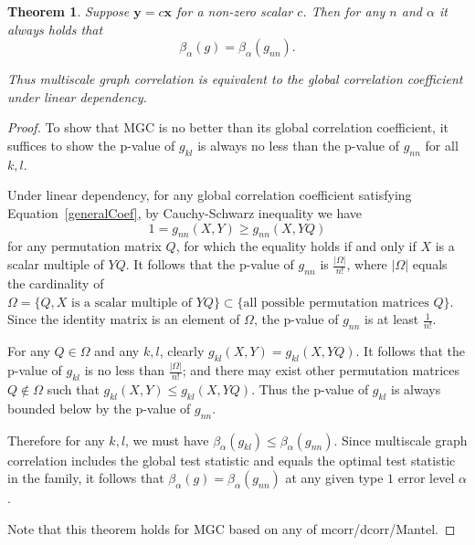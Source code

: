 \documentclass[11pt]{article}
\providecommand{\mb}[1]{\boldsymbol{#1}}
\newtheorem{thm}{Theorem}
\begin{document}
\begin{thm}
Suppose $\mb{y}=c\mb{x}$ for a non-zero scalar $c$. Then for any $n$ and $\alpha$ it always holds that
\begin{equation}
\beta_{\alpha}(g) = \beta_{\alpha}(g_{nn}).
\end{equation}

Thus multiscale graph correlation is equivalent to the global correlation coefficient under linear dependency.
\end{thm}
\begin{proof}
To show that MGC is no better than its global correlation coefficient, it suffices to show the p-value of $g_{kl}$ is always no less than the p-value of $g_{nn}$ for all $k,l$.


Under linear dependency, for any global correlation coefficient satisfying Equation~\ref{generalCoef}, by Cauchy-Schwarz inequality we have
\begin{equation}
1=g_{nn}(X, Y) \geq g_{nn}(X, YQ)
\end{equation}
for any permutation matrix $Q$, for which the equality holds if and only if $X$ is a scalar multiple of $YQ$. It follows that the p-value of $g_{nn}$ is $\frac{|\Omega|}{n!}$, where $|\Omega|$ equals the cardinality of $\Omega=\{Q, X \mbox{ is a scalar multiple of }YQ\} \subset \{\mbox{all possible permutation matrices }Q\}$. Since the identity matrix is an element of $\Omega$, the p-value of $g_{nn}$ is at least $\frac{1}{n!}$.

For any $Q \in \Omega$ and any $k,l$, clearly $g_{kl}(X,Y)=g_{kl}(X,YQ)$. It follows that the p-value of $g_{kl}$ is no less than $\frac{|\Omega|}{n!}$; and there may exist other permutation matrices $Q \notin \Omega$ such that $g_{kl}(X,Y) \leq g_{kl}(X,YQ)$. Thus the p-value of $g_{kl}$ is always bounded below by the p-value of $g_{nn}$.

Therefore for any $k,l$, we must have $\beta_{\alpha}(g_{kl}) \leq \beta_{\alpha}(g_{nn})$. Since multiscale graph correlation includes the global test statistic and equals the optimal test statistic in the family, it follows that $\beta_{\alpha}(g) = \beta_{\alpha}(g_{nn})$ at any given type $1$ error level $\alpha$.

Note that this theorem holds for MGC based on any of mcorr/dcorr/Mantel.
\end{proof}
\end{document}
